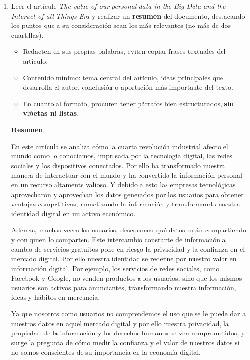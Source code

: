 \documentclass[12pt]{report}
\begin{document}
\begin{enumerate}[label=\textbf{\arabic*.}, leftmargin=*]
\begin{enumerate}[label=\textbf{\alph*.}, leftmargin=*, itemsep=1.0em]

\item Leer el art\'iculo \textit{The value of our personal data in the Big Data and the Internet of all Things Era} y realizar un \textbf{resumen} del documento, destacando los puntos que a su consideraci\'on sean los m\'as relevantes (no m\'as de dos cuartillas).
\begin{itemize}
  \item Redacten en sus propias palabras, eviten copiar frases textuales del art\'iculo.
  \item Contenido m\'inimo: tema central del art\'iculo, ideas principales que desarrolla el autor, conclusi\'on o aportaci\'on m\'as importante del texto.
  \item En cuanto al formato, procuren tener p\'arrafos bien estructurados, \textbf{sin vi\~netas ni listas}.
\end{itemize}

\textbf{Resumen}

En este artículo se analiza cómo la cuarta revolución industrial afecto el mundo como lo conocíamos, impulsada por la tecnología digital, las redes sociales y los dispositivos conectados. Por ello ha transformado nuestra manera de interactuar con el mundo y ha convertido la información personal en un recurso altamente valioso. Y debido a esto las empresas tecnológicas aprovecharon y aprovechan los datos generados por los usuarios para obtener ventajas competitivas, monetizando la información y transformando nuestra identidad digital en un activo económico.

Ademas, muchas veces los usuarios, desconocen qué datos están compartiendo y con quien lo comparten. Este intercambio constante de información a cambio de servicios gratuitos pone en riesgo la privacidad y la confianza en el mercado digital. 
Por ello nuestra identidad se redefine por nuestro valor en información digital. Por ejemplo, los servicios de redes sociales, como Facebook y Google, no venden productos a los usuarios, sino que los mismos usuarios son activos para anunciantes, transformando nuestra información, ideas y hábitos en mercancía.

Ya que nosotros como usuarios no comprendemos el uso que se le puede dar a nuestros datos en aquel mercado digital y por ello nuestra privacidad, la propiedad de la información y los derechos humanos se ven comprometidos, y surge la pregunta de cómo medir la confianza y el valor de nuestros datos si no somos conscientes de su importancia en la economía digital.


\end{enumerate}
\end{enumerate}
\end{document}
